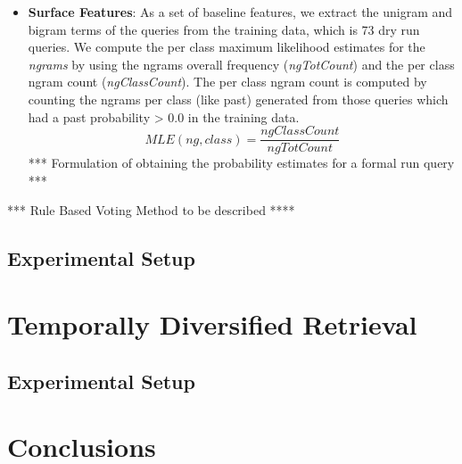 \documentclass{sig-alternate}
\begin{document}
\begin{itemize}
\item \textbf{Surface Features}:
As a set of baseline features, we extract the unigram and bigram terms of the queries from the training data, which is 73 dry run queries. We compute the per class maximum likelihood estimates for the \textit{ngrams} by using the ngrams overall frequency (\textit{ngTotCount}) and the per class ngram count (\textit{ngClassCount}). The per class ngram count is computed by counting the ngrams per class (like past) generated from those queries which had a past probability > 0.0 in the training data.
\begin{equation}\label{eq:1}
MLE(ng, class) = \frac{ngClassCount}{ngTotCount}
\end{equation}
*** Formulation of obtaining the probability estimates for a formal run query ***
\end{itemize}
*** Rule Based Voting Method to be described ****
\subsection{Experimental Setup}
\section{Temporally Diversified Retrieval}
\subsection{Experimental Setup}
\section{Conclusions}





\end{document}
